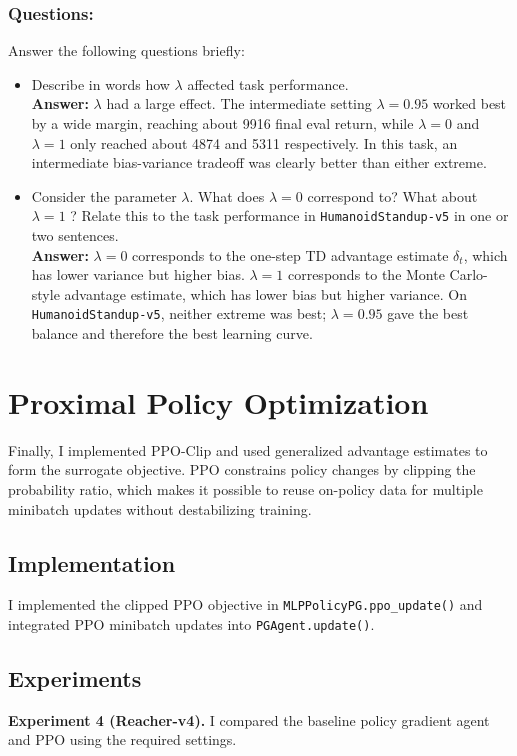 \documentclass{article}
\begin{document}
\subsubsection{Questions:}

Answer the following questions briefly:
\begin{itemize}
    \item Describe in words how $\lambda$ affected task performance. \\
    \textbf{Answer:} $\lambda$ had a large effect. The intermediate setting $\lambda=0.95$ worked best by a wide margin, reaching about 9916 final eval return, while $\lambda=0$ and $\lambda=1$ only reached about 4874 and 5311 respectively. In this task, an intermediate bias-variance tradeoff was clearly better than either extreme.
    \item Consider the parameter $\lambda$. What does $\lambda=0$ correspond to? What about $\lambda=1$ ? Relate this to the task performance in \texttt{HumanoidStandup-v5} in one or two sentences. \\
    \textbf{Answer:} $\lambda=0$ corresponds to the one-step TD advantage estimate $\delta_t$, which has lower variance but higher bias. $\lambda=1$ corresponds to the Monte Carlo-style advantage estimate, which has lower bias but higher variance. On \texttt{HumanoidStandup-v5}, neither extreme was best; $\lambda=0.95$ gave the best balance and therefore the best learning curve.
\end{itemize}

\section{Proximal Policy Optimization}
\label{sec:ppo}

Finally, I implemented PPO-Clip and used generalized advantage estimates to form the surrogate objective. PPO constrains policy changes by clipping the probability ratio, which makes it possible to reuse on-policy data for multiple minibatch updates without destabilizing training.

\subsection{Implementation}
I implemented the clipped PPO objective in \texttt{MLPPolicyPG.ppo\_update()} and integrated PPO minibatch updates into \texttt{PGAgent.update()}.

\subsection{Experiments}
\textbf{Experiment 4 (Reacher-v4).} I compared the baseline policy gradient agent and PPO using the required settings.
\end{document}

